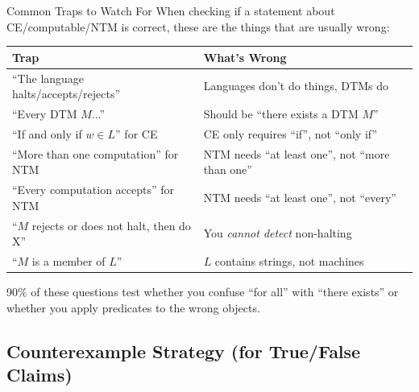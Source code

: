\documentclass[11pt,a4paper]{article}
\newcommand{\keytakeaway}[1]{%
  \par\vspace{0.3em}%
  \colorbox{yellow!60}{\parbox{\dimexpr\linewidth-2\fboxsep}{#1}}%
  \vspace{0.3em}}
\begin{document}
\begin{conceptbox}{Common Traps to Watch For}
When checking if a statement about CE/computable/NTM is correct, these are the things that are usually wrong:

\begin{center}
\renewcommand{\arraystretch}{1.3}
\begin{tabular}{l|l}
\toprule
\textbf{Trap} & \textbf{What's Wrong} \\
\midrule
``The language halts/accepts/rejects'' & Languages don't do things, DTMs do \\
``Every DTM $M$...'' & Should be ``there exists a DTM $M$'' \\
``If and only if $w \in L$'' for CE & CE only requires ``if'', not ``only if'' \\
``More than one computation'' for NTM & NTM needs ``at least one'', not ``more than one'' \\
``Every computation accepts'' for NTM & NTM needs ``at least one'', not ``every'' \\
``$M$ rejects or does not halt, then do X'' & You \emph{cannot detect} non-halting \\
``$M$ is a member of $L$'' & $L$ contains strings, not machines \\
\bottomrule
\end{tabular}
\end{center}

\keytakeaway{90\% of these questions test whether you confuse ``for all'' with ``there exists'' or whether you apply predicates to the wrong objects.}
\end{conceptbox}

\subsection{Counterexample Strategy (for True/False Claims)}
\end{document}
